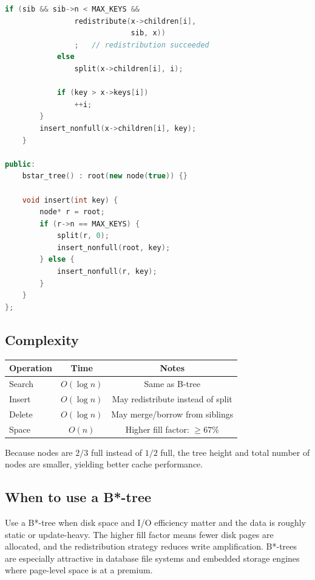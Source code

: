 \begin{lstlisting}[language=C++]
            if (sib && sib->n < MAX_KEYS &&
                redistribute(x->children[i],
                             sib, x))
                ;   // redistribution succeeded
            else
                split(x->children[i], i);

            if (key > x->keys[i])
                ++i;
        }
        insert_nonfull(x->children[i], key);
    }

public:
    bstar_tree() : root(new node(true)) {}

    void insert(int key) {
        node* r = root;
        if (r->n == MAX_KEYS) {
            split(r, 0);
            insert_nonfull(root, key);
        } else {
            insert_nonfull(r, key);
        }
    }
};
\end{lstlisting}

\subsection{Complexity}

\begin{center}
\begin{tabular}{lcc}
\toprule
Operation & Time & Notes \\
\midrule
Search & $O(\log n)$ & Same as B-tree \\
Insert & $O(\log n)$ & May redistribute instead of split \\
Delete & $O(\log n)$ & May merge/borrow from siblings \\
Space & $O(n)$ & Higher fill factor: $\geq 67\%$ \\
\bottomrule
\end{tabular}
\end{center}

Because nodes are $2/3$ full instead of $1/2$ full, the tree height and total number of nodes are smaller, yielding better cache performance.

\subsection{When to use a B*-tree}

Use a B*-tree when disk space and I/O efficiency matter and the data is roughly static or update-heavy. The higher fill factor means fewer disk pages are allocated, and the redistribution strategy reduces write amplification. B*-trees are especially attractive in database file systems and embedded storage engines where page-level space is at a premium.


